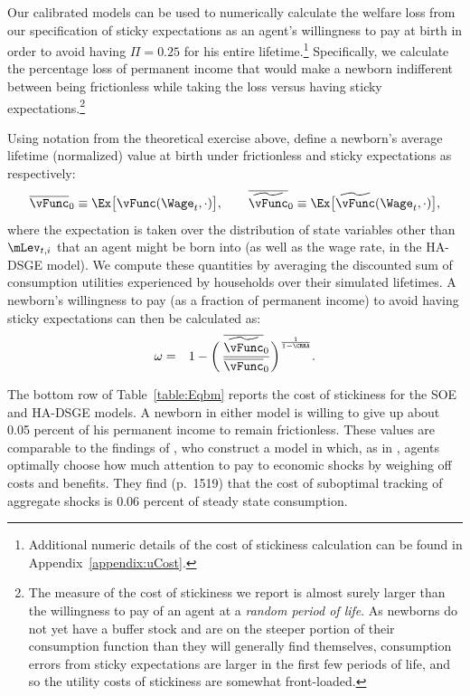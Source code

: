 \documentclass[titlepage]{\econtex}\newcommand{\texname}{cAndCwithStickyE}
\begin{document}
Our calibrated models can be used to numerically calculate the welfare loss from our specification of sticky expectations as an agent's willingness to pay at birth in order to avoid having $\Pi=0.25$ for his entire lifetime.\footnote{Additional numeric details of the cost of stickiness calculation can be found in Appendix~\ref{appendix:uCost}.}  Specifically, we calculate the percentage loss of permanent income that would make a newborn indifferent between being frictionless while taking the loss versus having sticky expectations.\footnote{The measure of the cost of stickiness we report is almost surely larger than the willingness to pay of an agent at a \textit{random period of life}.  As newborns do not yet have a buffer stock and are on the steeper portion of their consumption function than they will generally find themselves, consumption errors from sticky expectations are larger in the first few periods of life, and so the utility costs of stickiness are somewhat front-loaded.}

Using notation from the theoretical exercise above, define a newborn's average lifetime (normalized) value at birth under frictionless and sticky expectations as respectively:
\begin{equation*}
\overline{\vFunc}_0 \equiv \Ex \big[ \vFunc(\Wage_t,\cdot)\big], \qquad \overline{\perc{\vFunc}}_0 \equiv \Ex \big[ \perc{\vFunc}(\Wage_t,\cdot)\big],
\end{equation*}
where the expectation is taken over the distribution of state variables other than $\mLev_{t,i}$ that an agent might be born into (as well as the wage rate, in the HA-DSGE model).  We compute these quantities by averaging the discounted sum of consumption utilities experienced by households over their simulated lifetimes.  A newborn's willingness to pay (as a fraction of permanent income) to avoid having sticky expectations can then be calculated as:
\begin{eqnarray}\label{eq:WTP}
\omega & = & 1 - \bigg(\,\frac{\overline{\perc{\vFunc}}_0}{\overline{\vFunc}_0} \bigg)^{\frac{1}{1-\CRRA}}.
\end{eqnarray}

The bottom row of Table~\ref{table:Eqbm} reports the cost of stickiness for the SOE and HA-DSGE models.  A newborn in either model is willing to give up about 0.05 percent of his permanent income to remain frictionless.  These values are comparable to the findings of \cite{mackWiedREStud15}, who construct a model in which, as in \cite{reis:inattentive}, agents optimally choose how much attention to pay to economic shocks by weighing off costs and benefits.  They find (p.\ 1519) that the cost of suboptimal tracking of aggregate shocks is 0.06 percent of steady state consumption. %
\end{document}
